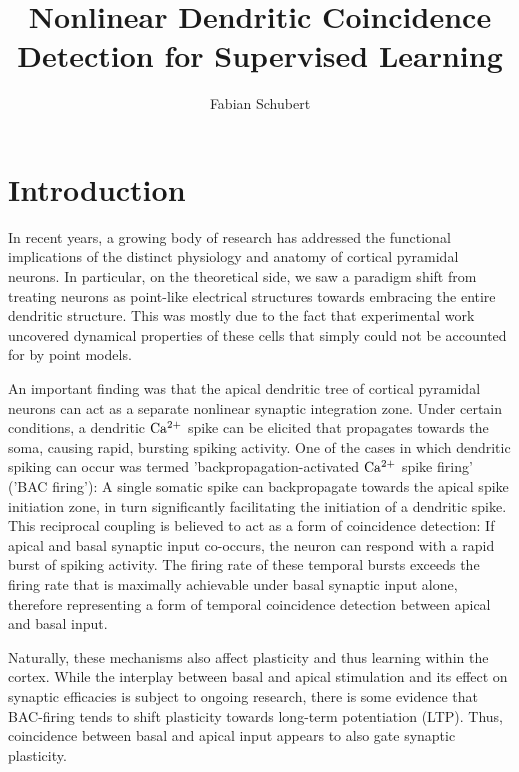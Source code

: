 \documentclass[10pt,a4paper,twocolumn]{article}
\author{Fabian Schubert}
\title{Nonlinear Dendritic Coincidence Detection for Supervised Learning}
\begin{document}
	\maketitle

		\section{Introduction}
		
		In recent years, a growing body of research has addressed the 
		functional implications of the distinct physiology and anatomy of 
		cortical pyramidal neurons. In particular, on the theoretical side,
		we saw a paradigm shift from treating neurons as point-like electrical
		structures towards embracing the entire dendritic structure. This was 
		mostly due to the fact that experimental work uncovered dynamical properties
		of these cells that simply could not be accounted for by point models.
		
		An important finding was that the apical dendritic tree of
		cortical pyramidal neurons can act as a separate nonlinear synaptic 
		integration zone. Under certain conditions, a dendritic $\rm Ca^{2+}$ spike
		can be elicited that propagates towards the soma, causing rapid, bursting
		spiking activity. One of the cases in which dendritic spiking can occur
		was termed 'backpropagation-activated $\rm Ca^{2+}$ spike firing' 
		('BAC firing'): A single somatic spike can backpropagate towards the apical
		spike initiation zone, in turn significantly facilitating the initiation of 
		a dendritic spike. This reciprocal coupling is believed to act as a form of
		coincidence detection: If apical and basal synaptic input co-occurs, the 
		neuron can respond with a rapid burst of spiking activity. The firing rate
		of these temporal bursts exceeds the firing rate that is maximally achievable 
		under basal synaptic input alone, therefore representing a form of temporal coincidence
		detection between apical and basal input.
		
		Naturally, these mechanisms also affect plasticity and thus learning
		within the cortex. While the interplay between basal and apical stimulation and
		its effect on synaptic efficacies is subject to ongoing research, there is
		some evidence that BAC-firing tends to shift plasticity towards long-term potentiation
		(LTP). Thus, coincidence between basal and apical input appears to also gate synaptic
		plasticity.
		
\end{document}
